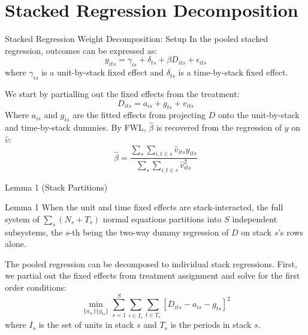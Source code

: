 \documentclass[11pt]{beamer}
\begin{document}
\section{Stacked Regression Decomposition}

\begin{frame}[label=stack_decomp]{Stacked Regression Weight Decomposition: Setup}
    In the pooled stacked regression, outcomes can be expressed as:
    \[
        y_{its} = \gamma_{is} + \delta_{ts} + \beta D_{its} + \epsilon_{its}
    \]
    where $\gamma_{is}$ is a unit-by-stack fixed effect and $\delta_{ts}$ is a
    time-by-stack fixed effect.

    \vspace{3mm}

    We start by partialling out the fixed effects from the treatment:
    \[
        D_{its} = a_{is} + g_{ts} + v_{its}
    \]
    Where $a_{is}$ and $g_{ts}$ are the fitted effects from projecting $D$ onto
    the unit-by-stack and time-by-stack dummies. By FWL, $\hat{\beta}$ is
    recovered from the regression of $y$ on $\hat{v}$:
    \[
        \hat{\beta} =
        \frac{\sum_s \sum_{i,t \in s} \hat{v}_{its} y_{its}}
             {\sum_s \sum_{i,t \in s} \hat{v}_{its}^2}
    \]
\end{frame}

\begin{frame}{Lemma 1 (Stack Partitions)}
    \begin{block}{Lemma 1}
        When the unit and time fixed effects are stack-interacted, the full
        system of $\sum_s (N_s + T_s)$ normal equations partitions into $S$
        independent subsystems, the $s$-th being the two-way dummy regression of
        $D$ on stack $s$'s rows alone.
    \end{block}

    \vspace{3mm}

    The pooled regression can be decomposed to individual stack regressions.
    First, we partial out the fixed effects from treatment assignment and solve
    for the first order conditions:
    \[
        \min_{\{a_{is}\}\{g_{ts}\}}
        \sum_{s=1}^{S} \sum_{i \in I_s} \sum_{t \in T_s}
        \left[ D_{its} - a_{is} - g_{ts} \right]^2
    \]
    where $I_s$ is the set of units in stack $s$ and $T_s$ is the periods in
    stack $s$.
\end{frame}
\end{document}
